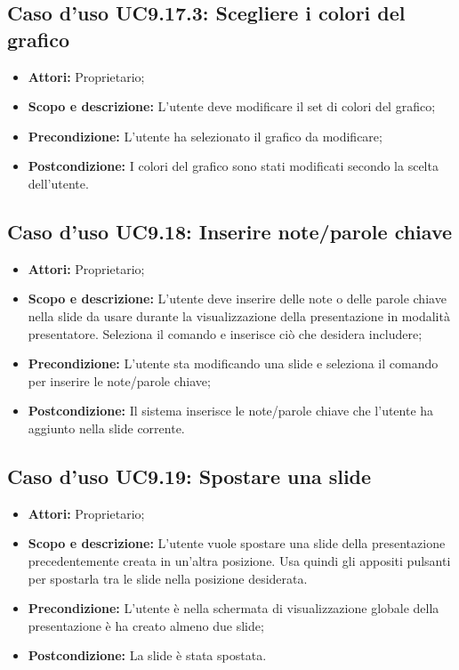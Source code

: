 		\subsection{Caso d'uso UC9.17.3: Scegliere i colori del grafico}
		\begin{itemize}
			\item \textbf{Attori:} Proprietario;
			\item \textbf{Scopo e descrizione:} L'utente deve modificare il set di colori del grafico;
			\item \textbf{Precondizione:} L'utente ha selezionato il grafico da modificare;
			\item \textbf{Postcondizione:} I colori del grafico sono stati modificati secondo la scelta dell'utente.
		\end{itemize}


\subsection{Caso d'uso UC9.18: Inserire note/parole chiave}
\begin{itemize}
	\item \textbf{Attori:} Proprietario;
	\item \textbf{Scopo e descrizione:} L'utente deve inserire delle note o delle parole chiave nella \gls{slide} da usare durante la visualizzazione della presentazione in modalità presentatore. Seleziona il comando e inserisce ciò che desidera includere;
	\item \textbf{Precondizione:} L'utente sta modificando una \gls{slide} e seleziona il comando per inserire le note/parole chiave;
	\item \textbf{Postcondizione:} Il sistema inserisce le note/parole chiave che l'utente ha aggiunto nella \gls{slide} corrente.
\end{itemize}

\subsection{Caso d'uso UC9.19: Spostare una slide}
\begin{itemize}
	\item \textbf{Attori:} Proprietario;
	\item \textbf{Scopo e descrizione:} L'utente vuole spostare una \gls{slide} della presentazione precedentemente creata in un'altra posizione. Usa quindi gli appositi pulsanti per spostarla tra le slide nella posizione desiderata.
	\item \textbf{Precondizione:} L'utente è nella schermata di visualizzazione globale della presentazione è ha creato almeno due slide;
	\item \textbf{Postcondizione:} La slide è stata spostata.
\end{itemize}
